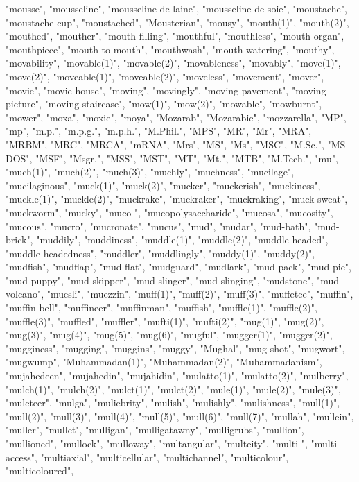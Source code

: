 "mousse",
"mousseline",
"mousseline-de-laine",
"mousseline-de-soie",
"moustache",
"moustache cup",
"moustached",
"Mousterian",
"mousy",
"mouth(1)",
"mouth(2)",
"mouthed",
"mouther",
"mouth-filling",
"mouthful",
"mouthless",
"mouth-organ",
"mouthpiece",
"mouth-to-mouth",
"mouthwash",
"mouth-watering",
"mouthy",
"movability",
"movable(1)",
"movable(2)",
"movableness",
"movably",
"move(1)",
"move(2)",
"moveable(1)",
"moveable(2)",
"moveless",
"movement",
"mover",
"movie",
"movie-house",
"moving",
"movingly",
"moving pavement",
"moving picture",
"moving staircase",
"mow(1)",
"mow(2)",
"mowable",
"mowburnt",
"mower",
"moxa",
"moxie",
"moya",
"Mozarab",
"Mozarabic",
"mozzarella",
"MP",
"mp",
"m.p.",
"m.p.g.",
"m.p.h.",
"M.Phil.",
"MPS",
"MR",
"Mr",
"MRA",
"MRBM",
"MRC",
"MRCA",
"mRNA",
"Mrs",
"MS",
"Ms",
"MSC",
"M.Sc.",
"MS-DOS",
"MSF",
"Msgr.",
"MSS",
"MST",
"MT",
"Mt.",
"MTB",
"M.Tech.",
"mu",
"much(1)",
"much(2)",
"much(3)",
"muchly",
"muchness",
"mucilage",
"mucilaginous",
"muck(1)",
"muck(2)",
"mucker",
"muckerish",
"muckiness",
"muckle(1)",
"muckle(2)",
"muckrake",
"muckraker",
"muckraking",
"muck sweat",
"muckworm",
"mucky",
"muco-",
"mucopolysaccharide",
"mucosa",
"mucosity",
"mucous",
"mucro",
"mucronate",
"mucus",
"mud",
"mudar",
"mud-bath",
"mud-brick",
"muddily",
"muddiness",
"muddle(1)",
"muddle(2)",
"muddle-headed",
"muddle-headedness",
"muddler",
"muddlingly",
"muddy(1)",
"muddy(2)",
"mudfish",
"mudflap",
"mud-flat",
"mudguard",
"mudlark",
"mud pack",
"mud pie",
"mud puppy",
"mud skipper",
"mud-slinger",
"mud-slinging",
"mudstone",
"mud volcano",
"muesli",
"muezzin",
"muff(1)",
"muff(2)",
"muff(3)",
"muffetee",
"muffin",
"muffin-bell",
"muffineer",
"muffinman",
"muffish",
"muffle(1)",
"muffle(2)",
"muffle(3)",
"muffled",
"muffler",
"mufti(1)",
"mufti(2)",
"mug(1)",
"mug(2)",
"mug(3)",
"mug(4)",
"mug(5)",
"mug(6)",
"mugful",
"mugger(1)",
"mugger(2)",
"mugginess",
"mugging",
"muggins",
"muggy",
"Mughal",
"mug shot",
"mugwort",
"mugwump",
"Muhammadan(1)",
"Muhammadan(2)",
"Muhammadanism",
"mujahedeen",
"mujahedin",
"mujahidin",
"mulatto(1)",
"mulatto(2)",
"mulberry",
"mulch(1)",
"mulch(2)",
"mulct(1)",
"mulct(2)",
"mule(1)",
"mule(2)",
"mule(3)",
"muleteer",
"mulga",
"muliebrity",
"mulish",
"mulishly",
"mulishness",
"mull(1)",
"mull(2)",
"mull(3)",
"mull(4)",
"mull(5)",
"mull(6)",
"mull(7)",
"mullah",
"mullein",
"muller",
"mullet",
"mulligan",
"mulligatawny",
"mulligrubs",
"mullion",
"mullioned",
"mullock",
"mulloway",
"multangular",
"multeity",
"multi-",
"multi-access",
"multiaxial",
"multicellular",
"multichannel",
"multicolour",
"multicoloured",
